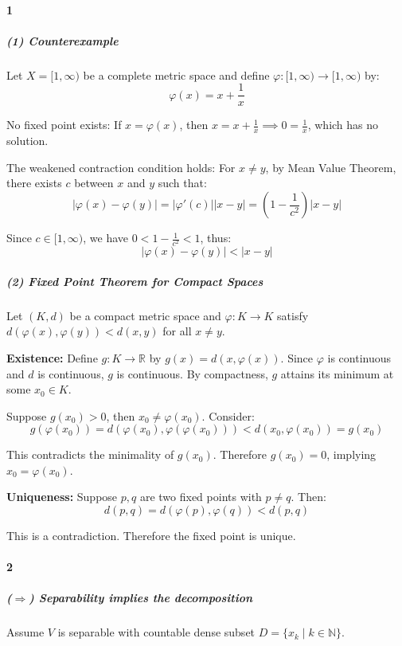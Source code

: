 \documentclass{ctexart}
\begin{document}
\paragraph{1}
\subparagraph{(1) Counterexample}

Let \(X = [1, \infty)\) be a complete metric space and define
\(\varphi: [1, \infty) \to [1, \infty)\) by:
\[
    \varphi(x) = x + \frac{1}{x}
\]

No fixed point exists: If \(x = \varphi(x)\), then \(x = x +
\frac{1}{x} \implies 0 = \frac{1}{x}\), which has no solution.

The weakened contraction condition holds: For \(x \neq y\), by Mean
Value Theorem, there exists \(c\) between \(x\) and \(y\) such that:
\[
    |\varphi(x) - \varphi(y)| = |\varphi'(c)||x-y| = \left(1 -
    \frac{1}{c^2}\right)|x-y|
\]

Since \(c \in [1, \infty)\), we have \(0 < 1 - \frac{1}{c^2} < 1\), thus:
\[
    |\varphi(x) - \varphi(y)| < |x-y|
\]

\subparagraph{(2) Fixed Point Theorem for Compact Spaces}

Let \((K, d)\) be a compact metric space and \(\varphi: K \to K\)
satisfy \(d(\varphi(x), \varphi(y)) < d(x, y)\) for all \(x \neq y\).

\textbf{Existence:} Define \(g: K \to \mathbb{R}\) by \(g(x) = d(x,
\varphi(x))\). Since \(\varphi\) is continuous and \(d\) is
continuous, \(g\) is continuous. By compactness, \(g\) attains its
minimum at some \(x_0 \in K\).

Suppose \(g(x_0) > 0\), then \(x_0 \neq \varphi(x_0)\). Consider:
\[
    g(\varphi(x_0)) = d(\varphi(x_0), \varphi(\varphi(x_0))) < d(x_0,
    \varphi(x_0)) = g(x_0)
\]

This contradicts the minimality of \(g(x_0)\). Therefore \(g(x_0) =
0\), implying \(x_0 = \varphi(x_0)\).

\textbf{Uniqueness:} Suppose \(p, q\) are two fixed points with \(p
\neq q\). Then:
\[
    d(p, q) = d(\varphi(p), \varphi(q)) < d(p, q)
\]

This is a contradiction. Therefore the fixed point is unique.

\paragraph{2}
\subparagraph{(\(\Rightarrow\)) Separability implies the decomposition}

Assume \(V\) is separable with countable dense subset \(D = \{x_k
\mid k \in \mathbb{N}\}\).
\end{document}
